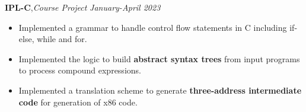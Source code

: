 \textbf{IPL-C}\sep{\it Course Project} \hfill{\sl \small January-April 2023}\\
\vspace{-8pt}
\begin{itemize}[itemsep = -1.7 mm, leftmargin=*]
\item Implemented a grammar to handle control flow statements in C including if-else, while and for.
\item Implemented the logic to build \textbf{abstract syntax trees} from input programs to process compound expressions.
\item Implemented a translation scheme to generate \textbf{three-address intermediate code} for generation of x86 code.
\end{itemize}
